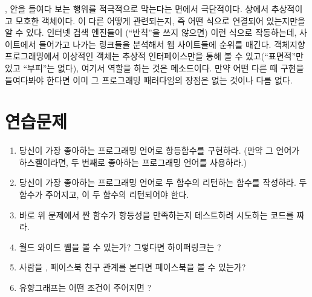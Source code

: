\trCategoryTheory\는, \trObject 안을 들여다 보는 행위를 적극적으로 막는다는 면에서 극단적이다.
\trCategoryTheory 상에서 \trObject\는 추상적이고 모호한 객체이다.
이 \trObject\가 다른 \trObject\와 어떻게 관련되는지, 즉 \trArrow\로 어떤 식으로 연결되어 있는지만을 알 수 있다.
인터넷 검색 엔진들이 (``반칙''을 쓰지 않으면) 이런 식으로 작동하는데, 
사이트에서 들어가고 나가는 링크들을 분석해서 웹 사이트들에 순위를 매긴다.
객체지향 프로그래밍에서 이상적인 객체는 추상적 인터페이스만을 통해 볼 수 있고(``표면적''만 있고 ``부피''는 없다),
여기서  역할을 하는 것은 메소드이다. 
만약 어떤 \trObject\를 다른 \trObject\와  때  구현을 들여다봐야 한다면
이미 그 프로그래밍 패러다임의 장점은 없는 것이나 다름 없다.

\section{연습문제}

\begin{enumerate}
\tightlist
\item
  당신이 가장 좋아하는 프로그래밍 언어로 항등함수를 구현하라.
  (만약 그 언어가 하스켈이라면, 두 번째로 좋아하는 프로그래밍 언어를 사용하라.)
\item
  당신이 가장 좋아하는 프로그래밍 언어로 두 함수의 \trComposition\을 리턴하는 함수를 작성하라.
  \trArgument\로 두 함수가 주어지고, 이 두 함수의 \trComposition\이 리턴되어야 한다.  
\item
  바로 위 문제에서 짠 함수가 항등성을 만족하는지 테스트하려 시도하는 코드를 짜라.
\item
  월드 와이드 웹을 \trCategory\라 볼 수 있는가? 그렇다면 하이퍼링크는 ?
\item
  사람을 \trObject, 페이스북 친구 관계를 \trMorphism{} 본다면
  페이스북을 \trCategory\라 볼 수 있는가?
\item
  유향그래프는 어떤 조건이 주어지면 ?
\end{enumerate}
